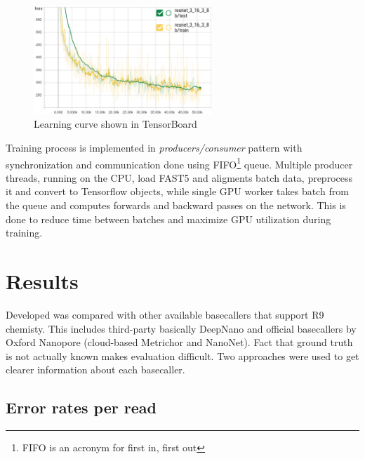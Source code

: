 \documentclass[times, utf8, diplomski, numeric, english]{fer}
\begin{document}
\begin{figure}[!ht]
	\begin{center}
		\includegraphics[width=0.6\textwidth]{./imgs/train_tb.png}
		\caption{Learning curve shown in TensorBoard}
		\label{fg:learn}
	\end{center}
\end{figure}

Training process is implemented in \textit{producers/consumer} pattern with synchronization and communication done using FIFO\footnote{FIFO is an acronym for first in, first out} queue. Multiple producer threads, running on the CPU, load FAST5 and aligments batch data, preprocess it and convert to Tensorflow objects, while single GPU worker takes batch from the queue and computes forwards and backward passes on the network. This is done to reduce time between batches and maximize GPU utilization during training. 












\chapter{Results}
Developed was compared with other available basecallers that support R9 chemisty. This includes third-party basically DeepNano and official basecallers by Oxford Nanopore (cloud-based Metrichor and NanoNet).
Fact that ground truth is not actually known makes evaluation difficult. Two approaches were used to get clearer information about each basecaller.



\section{Error rates per read}
\end{document}
